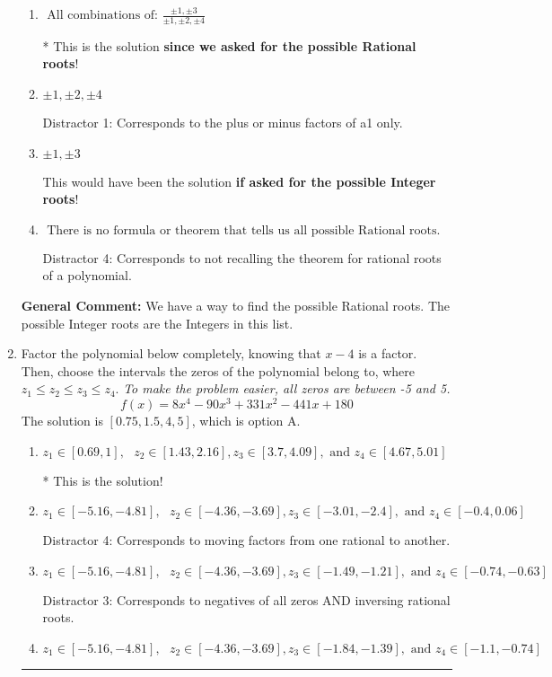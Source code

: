 \documentclass{extbook}[14pt]
\newcommand{\litem}[1]{\item #1

\rule{\textwidth}{0.4pt}}
\begin{document}
\begin{enumerate}
{\begin{enumerate}[label=\Alph*.]
 Distractor 3: Corresponds to the plus or minus of the inverse quotient (an/a0) of the factors. 
\item \( \text{ All combinations of: }\frac{\pm 1,\pm 3}{\pm 1,\pm 2,\pm 4} \)

* This is the solution \textbf{since we asked for the possible Rational roots}!
\item \( \pm 1,\pm 2,\pm 4 \)

 Distractor 1: Corresponds to the plus or minus factors of a1 only.
\item \( \pm 1,\pm 3 \)

This would have been the solution \textbf{if asked for the possible Integer roots}!
\item \( \text{ There is no formula or theorem that tells us all possible Rational roots.} \)

 Distractor 4: Corresponds to not recalling the theorem for rational roots of a polynomial.
\end{enumerate}

\textbf{General Comment:} We have a way to find the possible Rational roots. The possible Integer roots are the Integers in this list.
}
\litem{
Factor the polynomial below completely, knowing that $x-4$ is a factor. Then, choose the intervals the zeros of the polynomial belong to, where $z_1 \leq z_2 \leq z_3 \leq z_4$. \textit{To make the problem easier, all zeros are between -5 and 5.}
\[ f(x) = 8x^{4} -90 x^{3} +331 x^{2} -441 x + 180 \]The solution is \( [0.75, 1.5, 4, 5] \), which is option A.\begin{enumerate}[label=\Alph*.]
\item \( z_1 \in [0.69, 1], \text{   }  z_2 \in [1.43, 2.16], z_3 \in [3.7, 4.09], \text{   and   } z_4 \in [4.67, 5.01] \)

* This is the solution!
\item \( z_1 \in [-5.16, -4.81], \text{   }  z_2 \in [-4.36, -3.69], z_3 \in [-3.01, -2.4], \text{   and   } z_4 \in [-0.4, 0.06] \)

 Distractor 4: Corresponds to moving factors from one rational to another.
\item \( z_1 \in [-5.16, -4.81], \text{   }  z_2 \in [-4.36, -3.69], z_3 \in [-1.49, -1.21], \text{   and   } z_4 \in [-0.74, -0.63] \)

 Distractor 3: Corresponds to negatives of all zeros AND inversing rational roots.
\item \( z_1 \in [-5.16, -4.81], \text{   }  z_2 \in [-4.36, -3.69], z_3 \in [-1.84, -1.39], \text{   and   } z_4 \in [-1.1, -0.74] \)


\end{enumerate}}
\end{enumerate}
\end{document}

